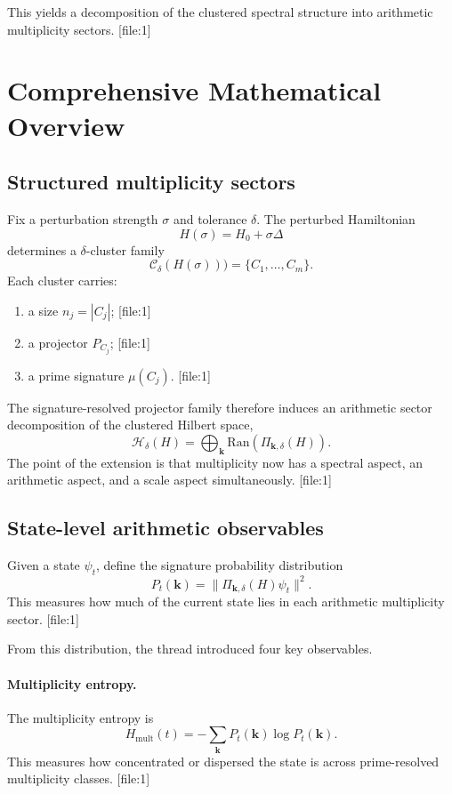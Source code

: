 \documentclass[11pt]{article}
\begin{document}
This yields a decomposition of the clustered spectral structure into arithmetic multiplicity sectors. [file:1]

\section{Comprehensive Mathematical Overview}

\subsection{Structured multiplicity sectors}

Fix a perturbation strength $\sigma$ and tolerance $\delta$. The perturbed Hamiltonian
\[
H(\sigma)=H_0+\sigma\Delta
\]
determines a $\delta$-cluster family
\[
\mathcal C_{\delta}(H(\sigma))) = \{C_1,\dots,C_m\}.
\]
Each cluster carries:
\begin{enumerate}
    \item a size $n_j = |C_j|$; [file:1]
    \item a projector $P_{C_j}$; [file:1]
    \item a prime signature $\mu(C_j)$. [file:1]
\end{enumerate}

The signature-resolved projector family therefore induces an arithmetic sector decomposition of the clustered Hilbert space,
\[
\mathcal H_{\delta}(H) = \bigoplus_{\mathbf{k}} \mathrm{Ran}(\Pi_{\mathbf{k},\delta}(H)).
\]
The point of the extension is that multiplicity now has a spectral aspect, an arithmetic aspect, and a scale aspect simultaneously. [file:1]

\subsection{State-level arithmetic observables}

Given a state $\psi_t$, define the signature probability distribution
\[
P_t(\mathbf{k}) = \|\Pi_{\mathbf{k},\delta}(H)\psi_t\|^2.
\]
This measures how much of the current state lies in each arithmetic multiplicity sector. [file:1]

From this distribution, the thread introduced four key observables.

\paragraph{Multiplicity entropy.}
The multiplicity entropy is
\[
H_{\mathrm{mult}}(t) = -\sum_{\mathbf{k}} P_t(\mathbf{k})\log P_t(\mathbf{k}).
\]
This measures how concentrated or dispersed the state is across prime-resolved multiplicity classes. [file:1]
\end{document}
